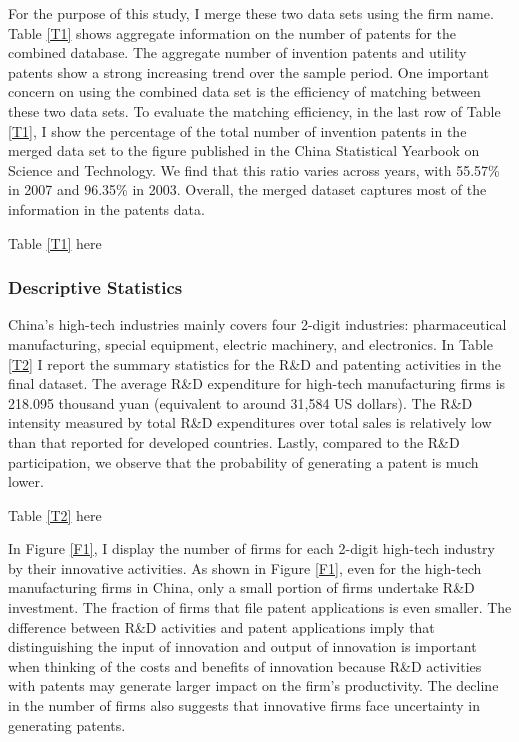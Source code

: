 \documentclass[English]{article}
\begin{document}
For the purpose of this study, I merge these two data sets using the
firm name. Table \ref{T1} shows aggregate information on the number of patents
for the combined database. The aggregate number of invention patents
and utility patents show a strong increasing trend over the sample
period. One important concern on using the combined data set is the
efficiency of matching between these two data sets. To evaluate the
matching efficiency, in the last row of Table \ref{T1}, I show the percentage
of the total number of invention patents in the merged data set to
the figure published in the China Statistical Yearbook on Science
and Technology. We find that this ratio varies across years, with
55.57\% in 2007 and 96.35\% in 2003. Overall, the merged dataset captures most of the information in the patents data.
\begin{center}
Table \ref{T1} here
\par\end{center}

\subsubsection{Descriptive Statistics}
China's
high-tech industries mainly covers four 2-digit industries: pharmaceutical
manufacturing, special equipment, electric machinery, and electronics. In Table \ref{T2} I report the summary statistics for the R\&D and patenting activities in the final dataset. The average R\&D expenditure for high-tech manufacturing firms is
218.095 thousand yuan (equivalent to around 31,584 US dollars).
The R\&D intensity measured by total R\&D expenditures over total sales is relatively low than that reported for developed countries. Lastly, compared to the R\&D participation, we observe that the probability of generating a patent is much lower. 

\begin{center}
Table \ref{T2} here
\par\end{center}

In Figure \ref{F1}, I display the number of firms for each 2-digit high-tech industry
by their innovative activities. As shown in Figure \ref{F1}, even
for the high-tech manufacturing firms in China, only a small portion of firms
undertake R\&D investment. The fraction
of firms that file patent applications is even smaller. The difference
between R\&D activities and patent applications imply that distinguishing
the input of innovation and output of innovation is important when
thinking of the costs and benefits of innovation because R\&D activities with patents may generate larger impact on the firm's productivity. The decline in the number of firms also suggests that innovative firms face uncertainty in generating patents. 
\end{document}
